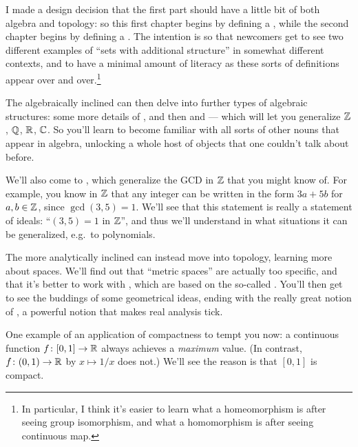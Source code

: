 \begin{itemize}
I made a design decision that the first part
should have a little bit of both algebra and topology:
so this first chapter begins by defining a ,
while the second chapter begins by defining a .
The intention is so that newcomers get to see two different
examples of ``sets with additional structure''
in somewhat different contexts,
and to have a minimal amount of literacy as these sorts
of definitions appear over and over.\footnote{In particular,
	I think it's easier to learn
	what a homeomorphism is after seeing group isomorphism,
	and what a homomorphism is after seeing continuous map.}

The algebraically inclined can then delve into
further types of algebraic structures:
some more details of ,
and then  and  ---
which will let you generalize $\mathbb Z$, $\mathbb Q$, $\mathbb R$, $\mathbb C$.
So you'll learn to become familiar with all sorts of other nouns
that appear in algebra, unlocking a whole host of objects
that one couldn't talk about before.

We'll also come to ,
which generalize the GCD in $\mathbb Z$ that you might know of.
For example, you know in $\mathbb Z$ that any integer
can be written in the form $3a+5b$ for $a,b \in \mathbb Z$,
since $\gcd(3,5)=1$.
We'll see that this statement is really
a statement of ideals: ``$(3,5)=1$ in $\mathbb Z$'',
and thus we'll understand in what situations
it can be generalized, e.g.\ to polynomials.

The more analytically inclined can instead move into topology,
learning more about spaces.
We'll find out that ``metric spaces'' are actually too specific,
and that it's better to work with ,
which are based on the so-called .
You'll then get to see the buddings of some geometrical ideas,
ending with the really great notion of ,
a powerful notion that makes real analysis tick.

One example of an application of compactness to tempt you now:
a continuous function $f \colon [0,1] \to \mathbb R$
always achieves a \emph{maximum} value.
(In contrast, $f \colon (0,1) \to \mathbb R$ by $x \mapsto 1/x$ does not.)
We'll see the reason is that $[0,1]$ is compact.
\end{itemize}

